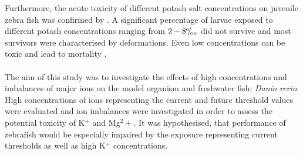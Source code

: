 \documentclass[twoside]{article}
\def\permille{\ensuremath{{}^\text{o}\mkern-5mu/\mkern-3mu_\text{oo}}}
\begin{document}
\begin{multicols}{2}
Furthermore, the acute toxicity of different potash salt concentrations on juvenile zebra fish was confirmed by \cite{meinelt2008}. A significant percentage of larvae exposed to different potash concentrations ranging from $2 - 8\permille$ did not survive and most survivors were characterised by deformations. Even low concentrations can be toxic and lead to mortality \citep{meinelt2008}. \\ \\ 

The aim of this study was to investigate the effects of high concentrations and imbalances of major ions on the model organism and freshwater fish; \textit{Danio rerio}. High concentrations of ions representing the current and future threshold values were evaluated and ion imbalances were investigated in order to assess the potential toxicity of K$^+$ and Mg${^2+}$. It was hypothesised, that performance of zebrafish would be especially impaired by the exposure representing current thresholds  as well as high K$^+$ concentrations. 


\end{multicols}
\end{document}
